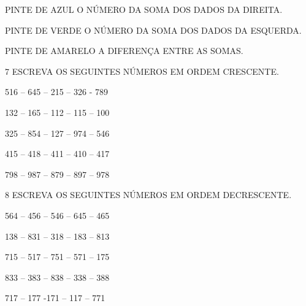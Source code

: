 \begin{escolha}[itemsep=0pt]
\item PINTE DE AZUL O NÚMERO DA SOMA DOS DADOS DA DIREITA.

\item PINTE DE VERDE O NÚMERO DA SOMA DOS DADOS DA ESQUERDA.

\item PINTE DE AMARELO A DIFERENÇA ENTRE AS SOMAS.
\end{escolha}


\num{7} ESCREVA OS SEGUINTES NÚMEROS EM ORDEM CRESCENTE.

\begin{escolha}
\item 516 -- 645 -- 215 -- 326 - 789


\item 132 -- 165 -- 112 -- 115 -- 100


\item 325 -- 854 -- 127 -- 974 -- 546


\item 415 -- 418 -- 411 -- 410 -- 417

\item 798 -- 987 -- 879 -- 897 -- 978

\end{escolha}


\num{8} ESCREVA OS SEGUINTES NÚMEROS EM ORDEM DECRESCENTE.

\begin{escolha}
\item 564 -- 456 -- 546 -- 645 -- 465

\item 138 -- 831 -- 318 -- 183 -- 813

\item 715 -- 517 -- 751 -- 571 -- 175

\item 833 -- 383 -- 838 -- 338 -- 388

\item 717 -- 177 -171 -- 117 -- 771

\end{escolha}

